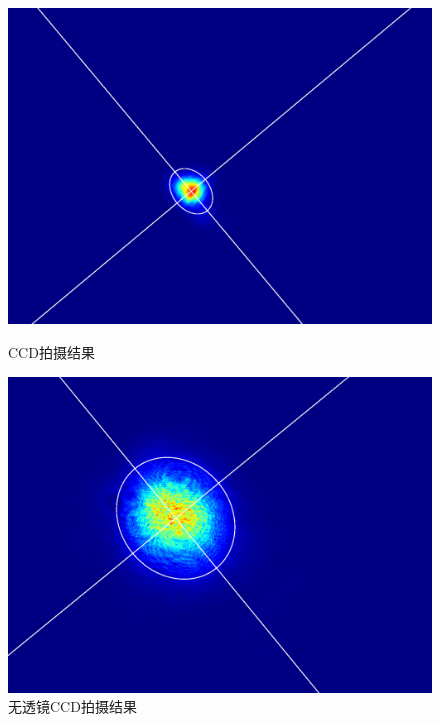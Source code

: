 \begin{figure}[H]
	\begin{minipage}{0.3\textwidth}
		\centering
		\includegraphics[width=\textwidth]{images/APL1_8_exp3_ccd}
		\caption{CCD拍摄结果}
		\label{fig:apl18exp3ccd}
	\end{minipage}
	\begin{minipage}{0.3\textwidth}
		\centering
		\includegraphics[width=\textwidth]{images/APL1_8_exp4_ccd}
		\caption{无透镜CCD拍摄结果}
		\label{fig:apl18exp4ccd}
	\end{minipage}
	\begin{minipage}{0.3\textwidth}
		\centering

\end{minipage}
\end{figure}
